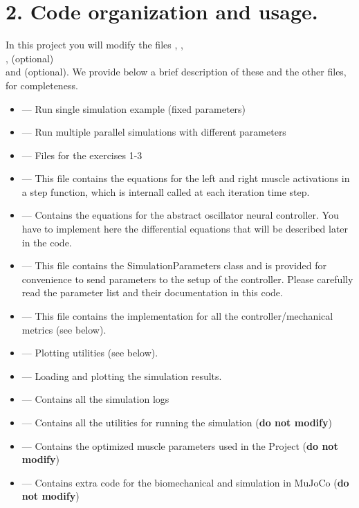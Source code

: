\documentclass{cmc}
\begin{document}
\section*{2. Code organization and usage.}\label{subsec:code}

In this project you will modify the files , , \\
,  (optional) \\ and  (optional). We provide below
a brief description of these and the other files, for completeness.

\begin{itemize}
\item {} --- Run single simulation example (fixed parameters)
\item {} --- Run multiple parallel simulations with different parameters
\item {} --- Files for the exercises 1-3
\item {} --- This file contains the equations for the left and right muscle activations in a step function, which is internall called at each iteration time step.
\item {} --- Contains the equations for the abstract oscillator neural controller. You have to implement here the differential equations that will be described later in the code.
\item {} --- This file contains the
  SimulationParameters class and is provided for convenience to send parameters
  to the setup of the controller. Please carefully read the parameter list
  and their documentation in this code.
\item {} --- This file contains the implementation
  for all the controller/mechanical metrics (see below).
\item {} --- Plotting utilities (see below).
\item {} --- Loading and plotting the simulation results.
\item {} --- Contains all the simulation logs
\item {} --- Contains all the utilities for running the simulation (\textbf{do not modify})
\item {} --- Contains the optimized muscle parameters used in the Project (\textbf{do not modify})
\item {} --- Contains extra code for the biomechanical and simulation in MuJoCo (\textbf{do not modify})
\end{itemize}
\end{document}
